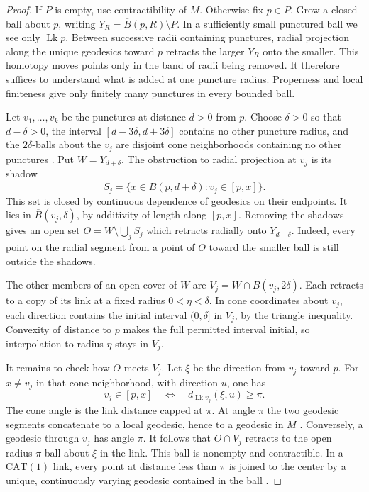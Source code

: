 \documentclass[11pt,a4paper]{article}
\numberwithin{equation}{section}
\begin{document}
\begin{proof}
If $P$ is empty, use contractibility of $M$. Otherwise fix $p\in P$. Grow a
closed ball about $p$, writing $Y_R=\overline B(p,R)\setminus P$. In a
sufficiently small punctured ball we see only $\operatorname{Lk}p$. Between
successive radii containing punctures, radial projection along the unique
geodesics toward $p$ retracts the larger $Y_R$ onto the smaller. This
homotopy moves points only in the band of radii being removed. It therefore
suffices to understand what is added at one puncture radius. Properness and
local finiteness give only finitely many punctures in every bounded ball.

Let $v_1,\ldots,v_k$ be the punctures at distance $d>0$ from $p$. Choose
$\delta>0$ so that $d-\delta>0$, the interval $[d-3\delta,d+3\delta]$
contains no other puncture radius, and the $2\delta$-balls about the $v_j$
are disjoint cone neighborhoods containing no other punctures
\cite[I.7.39]{r7}. Put $W=Y_{d+\delta}$. The obstruction to radial
projection at $v_j$ is its shadow
\[
 S_j=\{x\in\overline B(p,d+\delta):v_j\in[p,x]\}.
\]
This set is closed by continuous dependence of geodesics on their endpoints.
It lies in $\overline B(v_j,\delta)$, by additivity of length along $[p,x]$.
Removing the shadows gives an open set $O=W\setminus\bigcup_j S_j$ which
retracts radially onto $Y_{d-\delta}$. Indeed, every point on the radial
segment from a point of $O$ toward the smaller ball is still outside the
shadows.

The other members of an open cover of $W$ are $V_j=W\cap B(v_j,2\delta)$.
Each retracts to a copy of its link at a fixed radius $0<\eta<\delta$. In
cone coordinates about $v_j$, each direction contains the initial interval
$(0,\delta]$ in $V_j$, by the triangle inequality. Convexity of distance to
$p$ makes the full permitted interval initial, so interpolation to radius
$\eta$ stays in $V_j$.

It remains to check how $O$ meets $V_j$. Let $\xi$ be the direction from
$v_j$ toward $p$. For $x\neq v_j$ in that cone neighborhood, with direction
$u$, one has
\begin{equation}
 v_j\in[p,x]\quad\Longleftrightarrow\quad
 d_{\operatorname{Lk}v_j}(\xi,u)\geq\pi .
 \label{eq:link-shadow}
\end{equation}
The cone angle is the link distance capped at $\pi$. At angle $\pi$ the two
geodesic segments concatenate to a local geodesic, hence to a geodesic in
$M$ \cite[II.1.4]{r7}. Conversely, a geodesic through $v_j$ has angle $\pi$.
It follows that $O\cap V_j$ retracts to the open radius-$\pi$ ball about
$\xi$ in the link. This ball is nonempty and contractible. In a
$\mathrm{CAT}(1)$ link, every point at distance less than $\pi$ is joined to
the center by a unique, continuously varying geodesic contained in the
ball \cite[II.1.4]{r7}.


\end{proof}
\end{document}
